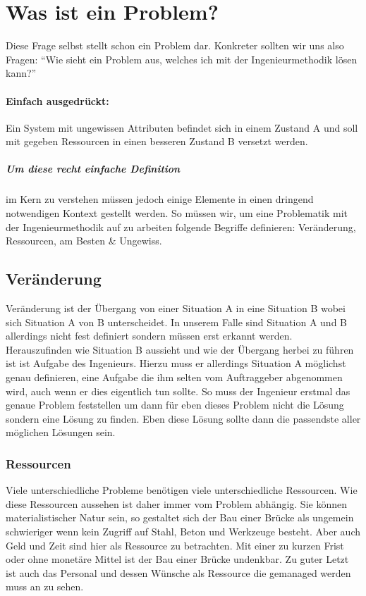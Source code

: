 \section{Was ist ein Problem?} \label{lab:kap2}

Diese Frage selbst stellt schon ein Problem dar. Konkreter sollten wir uns also Fragen: 
“Wie sieht ein Problem aus, welches ich mit der Ingenieurmethodik lösen kann?” 
\paragraph{Einfach ausgedrückt:} 

Ein System mit ungewissen Attributen befindet sich in einem Zustand A und 
soll mit gegeben Ressourcen in einen besseren Zustand B versetzt werden. 
\subparagraph{Um diese recht einfache Definition} 

im Kern zu verstehen müssen jedoch einige Elemente in 
einen dringend notwendigen Kontext gestellt werden. So müssen wir, um eine Problematik mit 
der Ingenieurmethodik auf zu arbeiten folgende Begriffe definieren: Veränderung, Ressourcen, 
am Besten \& Ungewiss.

    \subsection{Veränderung}

    Veränderung ist der Übergang von einer Situation A in eine Situation B wobei sich Situation A von B 
    unterscheidet. In unserem Falle sind Situation A und B allerdings nicht fest definiert sondern müssen 
    erst erkannt werden. Herauszufinden wie Situation B aussieht und wie der Übergang herbei zu führen ist
    ist Aufgabe des Ingenieurs. Hierzu muss er allerdings Situation A möglichst genau definieren, eine
    Aufgabe die ihm selten vom Auftraggeber abgenommen wird, auch wenn er dies eigentlich tun sollte.
    So muss der Ingenieur erstmal das genaue Problem feststellen um dann für eben dieses Problem nicht 
    die Lösung sondern eine Lösung zu finden. Eben diese Lösung sollte dann die passendste aller
    möglichen Lösungen sein.

    \subsubsection{Ressourcen}

    Viele unterschiedliche Probleme benötigen viele unterschiedliche Ressourcen. Wie diese Ressourcen 
    aussehen ist daher immer vom Problem abhängig. Sie können materialistischer Natur sein, so gestaltet 
    sich der Bau einer Brücke als ungemein schwieriger wenn kein Zugriff auf Stahl, Beton und Werkzeuge 
    besteht. Aber auch Geld und Zeit sind hier als Ressource zu betrachten. Mit einer zu kurzen Frist 
    oder ohne monetäre Mittel ist der Bau einer Brücke undenkbar. Zu guter Letzt ist auch das Personal 
    und dessen Wünsche als Ressource die gemanaged werden muss an zu sehen.

